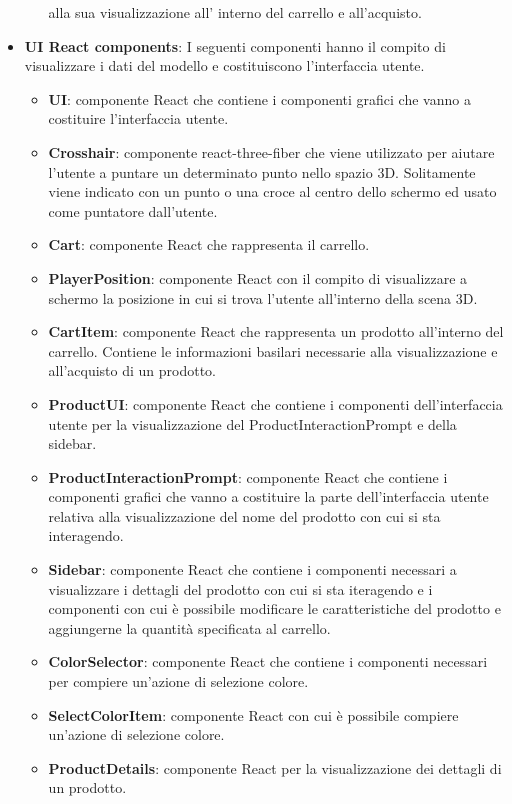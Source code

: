 \begin{itemize}
\begin{itemize}
			alla sua visualizzazione all' interno del carrello e all'acquisto.
		\end{itemize}
		\item \textbf{\large UI React components}:
		I seguenti componenti hanno il compito di visualizzare i dati del modello e costituiscono l'interfaccia 
		utente. 
		\begin{itemize}
			\item \textbf{UI}: componente React che contiene i componenti grafici che vanno a costituire l'interfaccia
			utente. 
			\item \textbf{Crosshair}: componente react-three-fiber che viene utilizzato per aiutare l'utente a puntare
			un determinato punto nello spazio 3D.
			Solitamente viene indicato con un punto o una croce al centro dello schermo ed usato come puntatore dall'utente.
			\item \textbf{Cart}: componente React che rappresenta il carrello.
			\item \textbf{PlayerPosition}: componente React con il compito di visualizzare a schermo la posizione in cui 
			si trova l'utente all'interno della scena 3D.
			\item \textbf{CartItem}: componente React che rappresenta un prodotto all'interno del carrello.
			Contiene le informazioni basilari necessarie alla visualizzazione e all'acquisto di un prodotto.
			\item \textbf{ProductUI}:  componente React che contiene i componenti dell'interfaccia utente per la visualizzazione
			del ProductInteractionPrompt e della sidebar.
			\item \textbf{ProductInteractionPrompt}: componente React che contiene i componenti grafici che vanno a costituire 
			la parte dell'interfaccia utente relativa alla visualizzazione del nome del prodotto con cui si sta interagendo.
			\item \textbf{Sidebar}: componente React che contiene i componenti necessari a visualizzare i 
			dettagli del prodotto con cui si sta iteragendo e i componenti con cui è possibile modificare le caratteristiche del 
			prodotto e aggiungerne la quantità specificata al carrello.
			\item \textbf{ColorSelector}: componente React che contiene i componenti necessari per compiere un'azione di selezione colore.
			\item \textbf{SelectColorItem}: componente React con cui è possibile compiere un'azione di selezione colore.
			\item \textbf{ProductDetails}: componente React per la visualizzazione dei dettagli di un prodotto.

\end{itemize}
\end{itemize}
